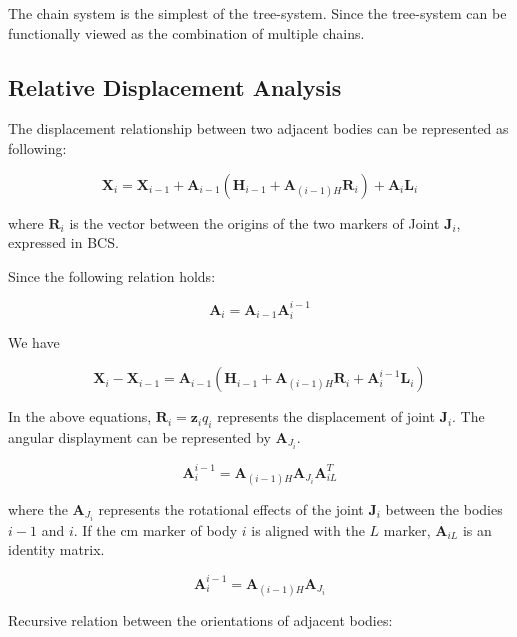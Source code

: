 \documentclass{article}
\begin{document}
The chain system is the simplest of the tree-system. Since the tree-system can be functionally viewed as the combination of multiple chains. 

\subsection{Relative Displacement Analysis}

The displacement relationship between two adjacent bodies can be represented as following:

\begin{equation}
	\mathbf{X}_i = \mathbf{X}_{i-1} + \mathbf{A}_{i-1}({\mathbf H}_{i-1}+{\mathbf A}_{(i-1)H}{\mathbf R}_i)+\mathbf{A}_i{\mathbf L}_i 
\end{equation}

where ${\mathbf R}_i$ is the vector between the origins of the two markers of Joint ${\mathbf J}_i$, expressed in BCS.
 
Since the following relation holds:

\begin{displaymath}
	\mathbf{A}_i = \mathbf{A}_{i-1}\mathbf{A}^{i-1}_i
\end{displaymath}

We have

\begin{equation}
	\mathbf{X}_i - \mathbf{X}_{i-1} = \mathbf{A}_{i-1}({\mathbf H}_{i-1}+\mathbf{A}_{(i-1)H}{\mathbf R}_i+\mathbf{A}^{i-1}_i{\mathbf L}_i)
\end{equation}

In the above equations, ${\mathbf R}_i=\mathbf{z}_iq_i$ represents the displacement of joint $\mathbf{J}_i$. The angular displayment can be represented by $\mathbf{A}_{J_i}$. 

\begin{displaymath}
	\mathbf{A}_i^{i-1} = \mathbf{A}_{(i-1)H}\mathbf{A}_{J_i}\mathbf{A}^T_{iL}
\end{displaymath}

where the $\mathbf{A}_{J_i}$ represents the rotational effects of the joint $\mathbf{J}_i$ between the bodies $i-1$ and $i$. If the cm marker of body $i$ is aligned with the $L$ marker, $\mathbf{A}_{iL}$ is an identity matrix. 

\begin{displaymath}
	\mathbf{A}_i^{i-1} = \mathbf{A}_{(i-1)H}\mathbf{A}_{J_i}
\end{displaymath}

Recursive relation between the orientations of adjacent bodies:
\end{document}
